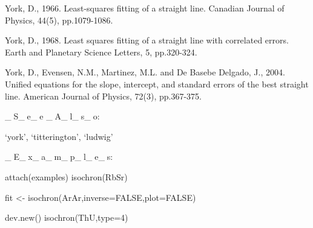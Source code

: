      York, D., 1966. Least-squares fitting of a straight line. Canadian
     Journal of Physics, 44(5), pp.1079-1086.

     York, D., 1968. Least squares fitting of a straight line with
     correlated errors. Earth and Planetary Science Letters, 5,
     pp.320-324.

     York, D., Evensen, N.M., Martinez, M.L. and De Basebe Delgado, J.,
     2004. Unified equations for the slope, intercept, and standard
     errors of the best straight line. American Journal of Physics,
     72(3), pp.367-375.

_S_e_e _A_l_s_o:

     ‘york’, ‘titterington’, ‘ludwig’

_E_x_a_m_p_l_e_s:

     attach(examples)
     isochron(RbSr)
     
     fit <- isochron(ArAr,inverse=FALSE,plot=FALSE)
     
     dev.new()
     isochron(ThU,type=4)
     

